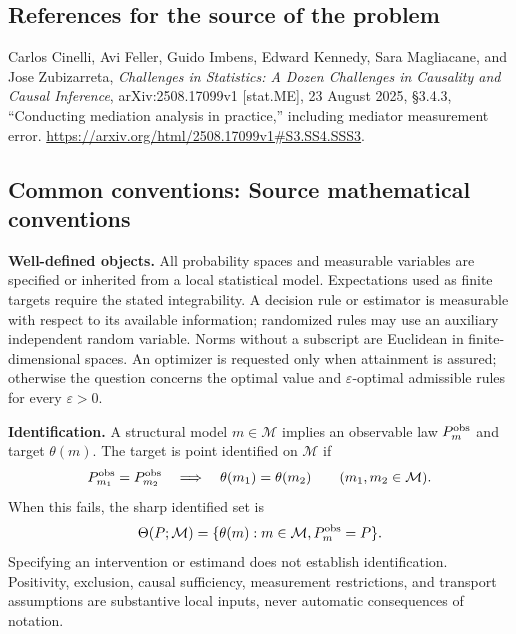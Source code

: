 \documentclass[11pt,a4paper]{article}
\begin{document}
\subsection*{References for the source of the problem}
Carlos Cinelli, Avi Feller, Guido Imbens, Edward Kennedy, Sara Magliacane, and Jose Zubizarreta, \emph{Challenges in Statistics: A Dozen Challenges in Causality and Causal Inference}, arXiv:2508.17099v1 [stat.ME], 23 August 2025, \S3.4.3, ``Conducting mediation analysis in practice,'' including mediator measurement error. \url{https://arxiv.org/html/2508.17099v1#S3.SS4.SSS3}.

\subsection*{Common conventions: Source mathematical conventions}

\textbf{Well-defined objects.}
All probability spaces and measurable variables are specified or inherited
from a local statistical model. Expectations used as finite targets require
the stated integrability. A decision rule or estimator is measurable with
respect to its available information; randomized rules may use an auxiliary
independent random variable. Norms without a subscript are Euclidean in
finite-dimensional spaces. An optimizer is requested only when attainment
is assured; otherwise the question concerns the optimal value and
$\varepsilon$-optimal admissible rules for every $\varepsilon>0$.

\textbf{Identification.}
A structural model $m\in\mathcal M$ implies an observable law
$P_m^{\rm obs}$ and target $\theta(m)$. The target is point identified on
$\mathcal M$ if
\[
 P_{m_1}^{\rm obs}=P_{m_2}^{\rm obs}
 \quad\Longrightarrow\quad\theta(m_1)=\theta(m_2)
 \qquad(m_1,m_2\in\mathcal M).
\]
When this fails, the sharp identified set is
\[
 \Theta(P;\mathcal M)=\{\theta(m):m\in\mathcal M,
                                  P_m^{\rm obs}=P\}.
\]
Specifying an intervention or estimand does not establish identification.
Positivity, exclusion, causal sufficiency, measurement restrictions, and
transport assumptions are substantive local inputs, never automatic
consequences of notation.
\end{document}
